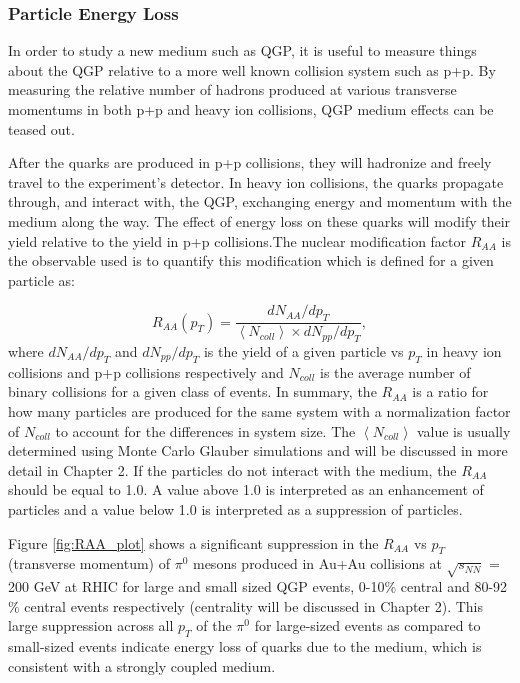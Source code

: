 \subsubsection{Particle Energy Loss}
In order to study a new medium such as QGP, it is useful to measure things about the QGP relative to a more well known collision system such as p+p. By measuring the relative number of hadrons produced at various transverse momentums in both p+p and heavy ion collisions, QGP medium effects can be teased out.

After the quarks are produced in p+p collisions, they will hadronize and freely travel to the experiment's detector. In heavy ion collisions, the quarks propagate through, and interact
with, the QGP, exchanging energy and momentum with the medium along the way. The effect of energy loss on these quarks will modify their yield relative to the yield in p+p collisions.The nuclear modification factor $R_{AA}$ is the observable used is to quantify this modification which is defined for a given particle as:

\begin{equation}\label{eqn:raa}
 R_{AA}(p_T) = \frac{dN_{AA}/dp_T}{\left<N_{coll}\right>\times dN_{pp}/dp_T},
\end{equation}
where $dN_{AA}/dp_T$ and $dN_{pp}/dp_T$ is the yield of a given particle vs $p_T$ in heavy ion collisions and p+p collisions respectively and $N_{coll}$ is the average number of binary collisions for a given class of events. In summary, the $R_{AA}$ is a ratio for how many particles are produced for the same system with a normalization factor of $N_{coll}$ to account for the differences in system size. The $\left<N_{coll}\right>$ value is usually determined using Monte Carlo Glauber simulations and will be discussed in more detail in Chapter 2. If the particles do not interact with the medium, the $R_{AA}$ should be equal to 1.0. A value above 1.0 is interpreted as an enhancement of particles and a value below 1.0 is interpreted as a suppression of particles. 

Figure \ref{fig:RAA_plot} shows a significant suppression in the $R_{AA}$ vs $p_T$ (transverse momentum) of $\pi^0$ mesons produced in Au+Au collisions at $\sqrt{s_{NN}}$ = 200 GeV at RHIC for large and small sized QGP events, 0-10$\%$ central and 80-92$\%$ central events respectively (centrality will be discussed in Chapter 2). This large suppression across all  $p_T$ of the $\pi^0$ for large-sized events as compared to small-sized events indicate energy loss of quarks due to the medium, which is consistent with a strongly coupled  medium.

